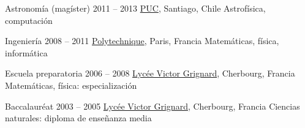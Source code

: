
\def\tbflanguage{spanish}
\def\tbfbordertop{1}
\def\tbfborderleft{0.7}








\begin{coordinatelist}
\end{coordinatelist}




\begin{yearlist}[7.7][\tbfborderleft][4]

\item[Astronomía (magíster)]{2011 -- 2013}
    {
    \href{http://www.uc.cl/}{PUC}, Santiago, Chile
    }
    {    Astrofísica, computación}
    

\item[Ingeniería]{2008 -- 2011}
    {
    \href{https://www.polytechnique.edu/}{Polytechnique}, Paris, Francia
    }
    {    Matemáticas, física, informática}


\item[Escuela preparatoria]{2006 -- 2008}
    {
    \href{http://www.lycee-grignard.fr/}{Lycée Victor Grignard}, Cherbourg, Francia
    }
    {    Matemáticas, física: especialización}


\item[Baccalaur\'eat]{2003 -- 2005}
    {
    \href{http://www.lycee-grignard.fr/}{Lycée Victor Grignard}, Cherbourg, Francia
    }
    {    Ciencias naturales: diploma de enseñanza media}
    
\end{yearlist}


